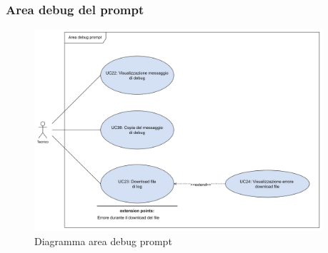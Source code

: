 \subsubsection*{Area debug del prompt}
\begin{figure}[H]
  \centering
  \includegraphics[width=0.95\textwidth]{assets/debug.png}
  \caption{Diagramma area debug prompt}
\end{figure}

















